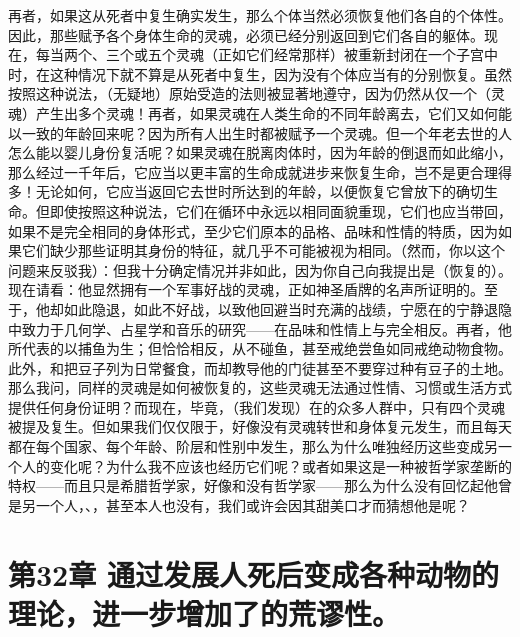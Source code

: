 再者，如果这从死者中复生确实发生，那么个体当然必须恢复他们各自的个体性。因此，那些赋予各个身体生命的灵魂，必须已经分别返回到它们各自的躯体。现在，每当两个、三个或五个灵魂（正如它们经常那样）被重新封闭在一个子宫中时，在这种情况下就不算是从死者中复生，因为没有个体应当有的分别恢复。虽然按照这种说法，（无疑地）原始受造的法则被显著地遵守，因为仍然从仅一个（灵魂）产生出多个灵魂！再者，如果灵魂在人类生命的不同年龄离去，它们又如何能以一致的年龄回来呢？因为所有人出生时都被赋予一个灵魂。但一个年老去世的人怎么能以婴儿身份复活呢？如果灵魂在脱离肉体时，因为年龄的倒退而如此缩小，那么经过一千年后，它应当以更丰富的生命成就进步来恢复生命，岂不是更合理得多！无论如何，它应当返回它去世时所达到的年龄，以便恢复它曾放下的确切生命。但即使按照这种说法，它们在循环中永远以相同面貌重现，它们也应当带回，如果不是完全相同的身体形式，至少它们原本的品格、品味和性情的特质，因为如果它们缺少那些证明其身份的特征，就几乎不可能被视为相同。（然而，你以这个问题来反驳我）：但我十分确定情况并非如此，因为你自己向我提出是（恢复的）。现在请看：他显然拥有一个军事好战的灵魂，正如神圣盾牌的名声所证明的。至于，他却如此隐退，如此不好战，以致他回避当时充满的战绩，宁愿在的宁静退隐中致力于几何学、占星学和音乐的研究——在品味和性情上与完全相反。再者，他所代表的以捕鱼为生；但恰恰相反，从不碰鱼，甚至戒绝尝鱼如同戒绝动物食物。此外，和把豆子列为日常餐食，而却教导他的门徒甚至不要穿过种有豆子的土地。那么我问，同样的灵魂是如何被恢复的，这些灵魂无法通过性情、习惯或生活方式提供任何身份证明？而现在，毕竟，（我们发现）在的众多人群中，只有四个灵魂被提及复生。但如果我们仅仅限于，好像没有灵魂转世和身体复元发生，而且每天都在每个国家、每个年龄、阶层和性别中发生，那么为什么唯独经历这些变成另一个人的变化呢？为什么我不应该也经历它们呢？或者如果这是一种被哲学家垄断的特权——而且只是希腊哲学家，好像和没有哲学家——那么为什么没有回忆起他曾是另一个人，、，甚至本人也没有，我们或许会因其甜美口才而猜想他是呢？\par


\section{第32章 通过发展人死后变成各种动物的理论，进一步增加了的荒谬性。}

